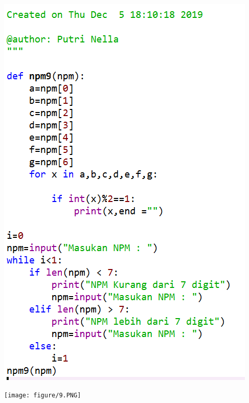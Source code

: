 \documentclass[a4paper, 12pt]{article}
\begin{document}
\item
\begin{center}
\includegraphics[width=.8\textwidth]{figure/8.PNG}
\end{center}
\item
\begin{center}
\texttt{[image: figure/9.PNG]}
\end{center}
\item
\end{document}
